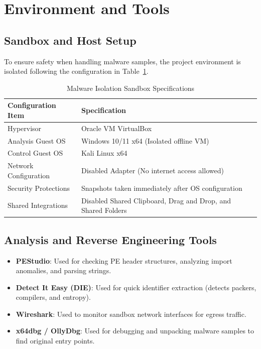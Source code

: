 \documentclass[11pt,a4paper]{article}
\begin{document}
\newpage

\section{Environment and Tools}

\subsection{Sandbox and Host Setup}
To ensure safety when handling malware samples, the project environment is isolated following the configuration in Table~\ref{tab:sandbox}.

\begin{table}[h]
\centering
\caption{Malware Isolation Sandbox Specifications}
\label{tab:sandbox}
\begin{tabular}{lp{10cm}}
\toprule
\textbf{Configuration Item} & \textbf{Specification} \\
\midrule
Hypervisor & Oracle VM VirtualBox \\
Analysis Guest OS & Windows 10/11 x64 (Isolated offline VM) \\
Control Guest OS & Kali Linux x64 \\
Network Configuration & Disabled Adapter (No internet access allowed) \\
Security Protections & Snapshots taken immediately after OS configuration \\
Shared Integrations & Disabled Shared Clipboard, Drag and Drop, and Shared Folders \\
\bottomrule
\end{tabular}
\end{table}

\subsection{Analysis and Reverse Engineering Tools}
\begin{itemize}
    \item \textbf{PEStudio}: Used for checking PE header structures, analyzing import anomalies, and parsing strings.
    \item \textbf{Detect It Easy (DIE)}: Used for quick identifier extraction (detects packers, compilers, and entropy).
    \item \textbf{Wireshark}: Used to monitor sandbox network interfaces for egress traffic.
    \item \textbf{x64dbg / OllyDbg}: Used for debugging and unpacking malware samples to find original entry points.
\end{itemize}
\end{document}
